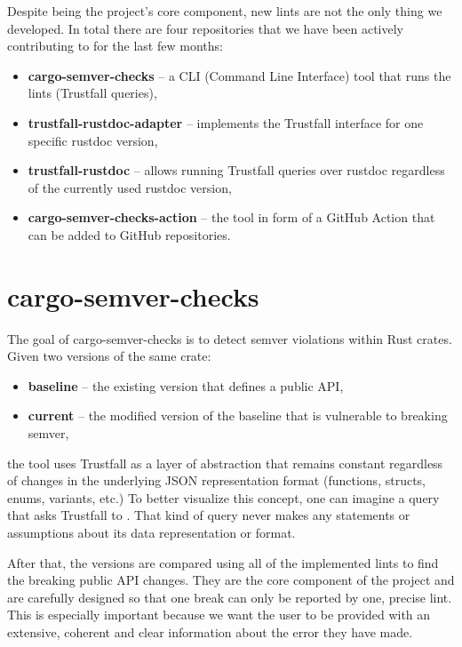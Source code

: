\documentclass[licencjacka,en]{pracamgr}
\begin{document}
Despite being the project's core component, new lints are not the only thing we developed. In total
there are four repositories that we have been actively contributing to for the last few months:
\begin{itemize}
	\item \textbf{cargo-semver-checks} -- a CLI (Command Line Interface) tool that runs the lints
		(Trustfall queries),
	\item \textbf{trustfall-rustdoc-adapter} -- implements the Trustfall interface for one specific
		rustdoc version,
	\item \textbf{trustfall-rustdoc} -- allows running Trustfall queries over rustdoc regardless of
		the currently used rustdoc version,
	\item \textbf{cargo-semver-checks-action} -- the tool in form of a GitHub Action that can
	    be added to GitHub repositories.
\end{itemize}

\section{cargo-semver-checks}\label{r:section_cargo_semver_checks}

The goal of cargo-semver-checks is to detect semver violations within Rust crates. Given two
versions of the same crate:
\begin{itemize}
	\item \textbf{baseline} -- the existing version that defines a public API,
	\item \textbf{current} -- the modified version of the baseline that is vulnerable to
		breaking semver,
\end{itemize}
the tool uses Trustfall as a layer of abstraction that remains constant regardless of changes in
the underlying JSON representation format (functions, structs, enums, variants, etc.) To better
visualize this concept, one can imagine a query that asks Trustfall to . That kind
of query never makes any statements or assumptions about its data representation or format.

After that, the versions are compared using all of the implemented lints to find the breaking
public API changes. They are the core component of the project and are carefully designed so that
one break can only be reported by one, precise lint. This is especially important because we want
the user to be provided with an extensive, coherent and clear information about the error they
have made.
\end{document}
